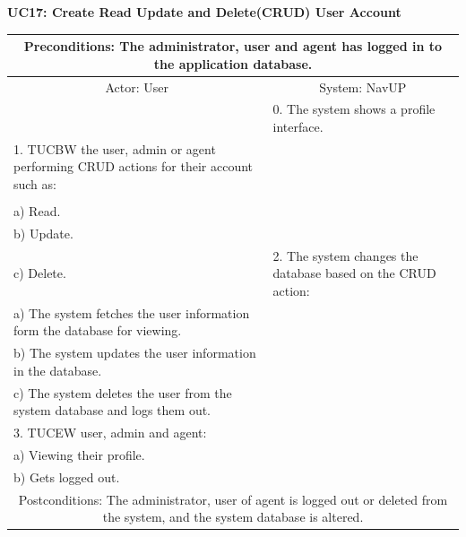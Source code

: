 \documentclass{article}
\begin{document}
				\vspace{5mm}
                \textbf{UC17: Create Read Update and Delete(CRUD) User Account}\\
                \vspace{3mm}
        		\centering
      		 \small
       		 \begin{tabular}{|p{8cm}|p{8cm}|}
       		 \hline
       		\multicolumn{2}{c}{ Preconditions: The administrator, user and agent has logged in to the application database.} \\
       		 \hline
       		\multicolumn{1}{c}{Actor: User} & \multicolumn{1}{c}{ System: NavUP} \\
        		\hline
       		 &0.	The system shows a profile interface.\\
       		 \hline
       		1.	TUCBW the user, admin or agent performing CRUD actions for their account such as:\\

\\a)	Read.
\\b)	Update.
\\c)	Delete.
 & 2.	The system changes the database based on the CRUD action:

\\a)	The system fetches the user information form the database for viewing.
\\b)	The system updates the user information in the database.
\\c)	The system deletes the user from the system database and logs them out.

\\
        		\hline
       		3.	TUCEW user, admin and agent:

\\a)	Viewing their profile.
\\b)	Gets logged out.
&\\
       		 \hline
        		\multicolumn{2}{c}{Postconditions: The administrator, user of agent is logged out or deleted from the system, and the system database is altered. } \\
        		\hline
        \end{tabular} 
        \endgroup
        
\end{document}
